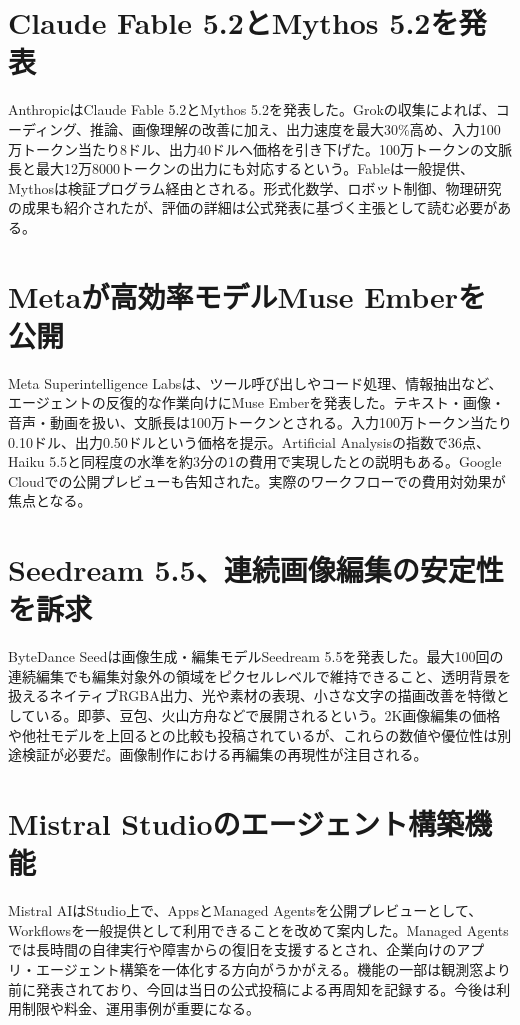 \section{Claude Fable 5.2とMythos 5.2を発表}
AnthropicはClaude Fable 5.2とMythos 5.2を発表した。Grokの収集によれば、コーディング、推論、画像理解の改善に加え、出力速度を最大30\%高め、入力100万トークン当たり8ドル、出力40ドルへ価格を引き下げた。100万トークンの文脈長と最大12万8000トークンの出力にも対応するという。Fableは一般提供、Mythosは検証プログラム経由とされる。形式化数学、ロボット制御、物理研究の成果も紹介されたが、評価の詳細は公式発表に基づく主張として読む必要がある。

\section{Metaが高効率モデルMuse Emberを公開}
Meta Superintelligence Labsは、ツール呼び出しやコード処理、情報抽出など、エージェントの反復的な作業向けにMuse Emberを発表した。テキスト・画像・音声・動画を扱い、文脈長は100万トークンとされる。入力100万トークン当たり0.10ドル、出力0.50ドルという価格を提示。Artificial Analysisの指数で36点、Haiku 5.5と同程度の水準を約3分の1の費用で実現したとの説明もある。Google Cloudでの公開プレビューも告知された。実際のワークフローでの費用対効果が焦点となる。

\section{Seedream 5.5、連続画像編集の安定性を訴求}
ByteDance Seedは画像生成・編集モデルSeedream 5.5を発表した。最大100回の連続編集でも編集対象外の領域をピクセルレベルで維持できること、透明背景を扱えるネイティブRGBA出力、光や素材の表現、小さな文字の描画改善を特徴としている。即夢、豆包、火山方舟などで展開されるという。2K画像編集の価格や他社モデルを上回るとの比較も投稿されているが、これらの数値や優位性は別途検証が必要だ。画像制作における再編集の再現性が注目される。

\section{Mistral Studioのエージェント構築機能}
Mistral AIはStudio上で、AppsとManaged Agentsを公開プレビューとして、Workflowsを一般提供として利用できることを改めて案内した。Managed Agentsでは長時間の自律実行や障害からの復旧を支援するとされ、企業向けのアプリ・エージェント構築を一体化する方向がうかがえる。機能の一部は観測窓より前に発表されており、今回は当日の公式投稿による再周知を記録する。今後は利用制限や料金、運用事例が重要になる。


